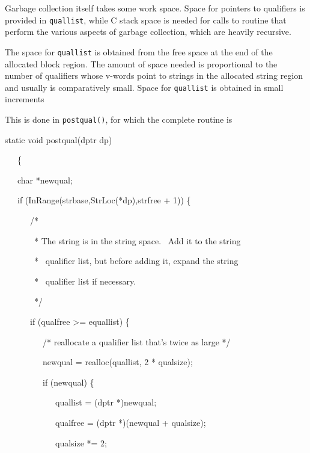Garbage collection itself takes some work space. Space for pointers to
qualifiers is provided in \texttt{quallist}, while C stack space is
needed for calls to routine that perform the various aspects of
garbage collection, which are heavily recursive.

The space for \texttt{quallist} is obtained from the free space at the
end of the allocated block region. The amount of space needed is
proportional to the number of qualifiers whose v-words point to
strings in the allocated string region and usually is comparatively
small. Space for \texttt{quallist} is obtained in small increments

This is done in \texttt{postqual()}, for which the complete routine is

{\ttfamily\mdseries
static void postqual(dptr dp)}

{\ttfamily\mdseries
\ \ \ \{}

{\ttfamily\mdseries
\ \ \ char *newqual;}


\bigskip

{\ttfamily\mdseries
\ \ \ if (InRange(strbase,StrLoc(*dp),strfree + 1)) \{}

{\ttfamily\mdseries
\ \ \ \ \ \ /*}

{\ttfamily\mdseries
\ \ \ \ \ \ \ * The string is in the string space. \ Add it to the string \ \ \ \ }

{\ttfamily\mdseries
\ \ \ \ \ \ \ * \ qualifier list, but before adding it, expand the string \ \ \ \ \ \ }

{\ttfamily\mdseries
\ \ \ \ \ \ \ * \ qualifier list if necessary.
}

{\ttfamily\mdseries
\ \ \ \ \ \ \ */
}

{\ttfamily\mdseries
\ \ \ \ \ \ if (qualfree {\textgreater}= equallist) \{
}


\bigskip

{\ttfamily\mdseries
\ \ \ \ \ \ \ \ \ /* reallocate a qualifier list that's twice as large */}

{\ttfamily\mdseries
\ \ \ \ \ \ \ \ \ newqual = realloc(quallist, 2 * qualsize);}

{\ttfamily\mdseries
\ \ \ \ \ \ \ \ \ if (newqual) \{
}

{\ttfamily\mdseries
\ \ \ \ \ \ \ \ \ \ \ \ quallist = (dptr *)newqual;
}

{\ttfamily\mdseries
\ \ \ \ \ \ \ \ \ \ \ \ qualfree = (dptr *)(newqual + qualsize);}

{\ttfamily\mdseries
\ \ \ \ \ \ \ \ \ \ \ \ qualsize *= 2;
}

